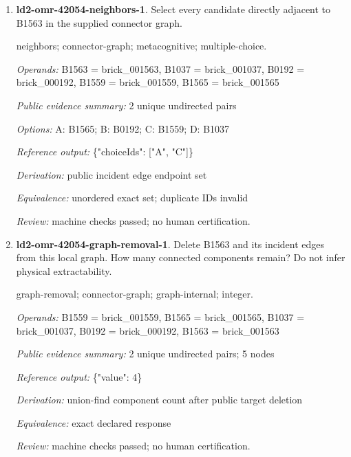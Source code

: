 \begin{enumerate}
\par{\small interface; connector-graph; metacognitive; single-choice.\par\textit{Operands:} B0942 = brick\_000942, B0940 = brick\_000940\par\textit{Public evidence summary:} \{"connectorRecord": \{"family": "stud", "aConnector": 5, "bConnector": 0\}, "scope": "Upstream connector tolerances and inset mesh intersections; unknown parts remain explicit, separate scene objects are not glued together; no load/force validation."\}\par\textit{Options:} A: stud; B: hinge; C: ball; D: fixed; E: axle\par\textit{Reference output:} \{"choiceId": "A"\}\par\textit{Derivation:} public connectorRecord.family equality\par\textit{Equivalence:} exact declared response\par\textit{Review:} machine checks passed; no human certification.}
\item \textbf{ld2-omr-42054-neighbors-1}. Select every candidate directly adjacent to B1563 in the supplied connector graph.
\par{\small neighbors; connector-graph; metacognitive; multiple-choice.\par\textit{Operands:} B1563 = brick\_001563, B1037 = brick\_001037, B0192 = brick\_000192, B1559 = brick\_001559, B1565 = brick\_001565\par\textit{Public evidence summary:} 2 unique undirected pairs\par\textit{Options:} A: B1565; B: B0192; C: B1559; D: B1037\par\textit{Reference output:} \{"choiceIds": ["A", "C"]\}\par\textit{Derivation:} public incident edge endpoint set\par\textit{Equivalence:} unordered exact set; duplicate IDs invalid\par\textit{Review:} machine checks passed; no human certification.}
\item \textbf{ld2-omr-42054-graph-removal-1}. Delete B1563 and its incident edges from this local graph. How many connected components remain? Do not infer physical extractability.
\par{\small graph-removal; connector-graph; graph-internal; integer.\par\textit{Operands:} B1559 = brick\_001559, B1565 = brick\_001565, B1037 = brick\_001037, B0192 = brick\_000192, B1563 = brick\_001563\par\textit{Public evidence summary:} 2 unique undirected pairs; 5 nodes\par\textit{Reference output:} \{"value": 4\}\par\textit{Derivation:} union-find component count after public target deletion\par\textit{Equivalence:} exact declared response\par\textit{Review:} machine checks passed; no human certification.}

\end{enumerate}
